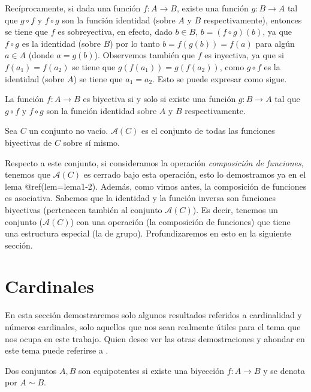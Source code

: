 \documentclass[12pt,]{krantz}
\theoremstyle{definition}
\theoremstyle{definition}
\theoremstyle{definition}
\theoremstyle{remark}
\let\BeginKnitrBlock\begin \let\EndKnitrBlock\end
\begin{document}
Recíprocamente, si dada una función \(f: A\longrightarrow B\), existe
una función \(g:B\longrightarrow A\) tal que \(g\circ f\) y \(f\circ g\)
son la función identidad (sobre \(A\) y \(B\) respectivamente), entonces
se tiene que \(f\) es sobreyectiva, en efecto, dado \(b\in B\),
\(b=(f\circ g)(b)\), ya que \(f\circ g\) es la identidad (sobre \(B\))
por lo tanto \(b=f(g(b))=f(a)\) para algún \(a\in A\) (donde
\(a=g(b)\)). Observemos también que \(f\) es inyectiva, ya que si
\(f(a_{1})=f(a_{2})\) se tiene que \(g(f(a_{1}))=g(f(a_{2}))\), como
\(g\circ f\) es la identidad (sobre \(A\)) se tiene que \(a_{1}=a_{2}\).
Esto se puede expresar como sigue.

\BeginKnitrBlock{lemma}
\protect\hypertarget{lem:unnamed-chunk-45}{}{\label{lem:unnamed-chunk-45}
}La función \(f:A\longrightarrow B\) es biyectiva si y solo si existe
una función \(g:B\longrightarrow A\) tal que \(g\circ f\) y \(f\circ g\)
son la función identidad sobre \(A\) y \(B\) respectivamente.
\EndKnitrBlock{lemma}

\BeginKnitrBlock{definition}
\protect\hypertarget{def:unnamed-chunk-46}{}{\label{def:unnamed-chunk-46}
}Sea \(C\) un conjunto no vacío. \(\mathcal{A}(C)\) es el conjunto de
todas las funciones biyectivas de \(C\) sobre sí mismo.
\EndKnitrBlock{definition}

Respecto a este conjunto, si consideramos la operación \emph{composición
de funciones}, tenemos que \(\mathcal{A}(C)\) es cerrado bajo esta
operación, esto lo demostramos ya en el lema @ref(lem=lema1-2). Además,
como vimos antes, la composición de funciones es asociativa. Sabemos que
la identidad y la función inversa son funciones biyectivas (pertenecen
también al conjunto \(\mathcal{A}(C)\)). Es decir, tenemos un conjunto
(\(\mathcal{A}(C)\)) con una operación (la composición de funciones) que
tiene una estructura especial (la de grupo). Profundizaremos en esto en
la siguiente sección.

\section{Cardinales}\label{cardinales}

En esta sección demostraremos solo algunos resultados referidos a
cardinalidad y números cardinales, solo aquellos que nos sean realmente
útiles para el tema que nos ocupa en este trabajo. Quien desee ver las
otras demostraciones y ahondar en este tema puede referirse a .

\BeginKnitrBlock{definition}
\protect\hypertarget{def:unnamed-chunk-47}{}{\label{def:unnamed-chunk-47}
}Dos conjuntos \(A, B\) son equipotentes si existe una biyección
\(f:A \longrightarrow B\) y se denota por \(A\sim B\).
\EndKnitrBlock{definition}
\end{document}

